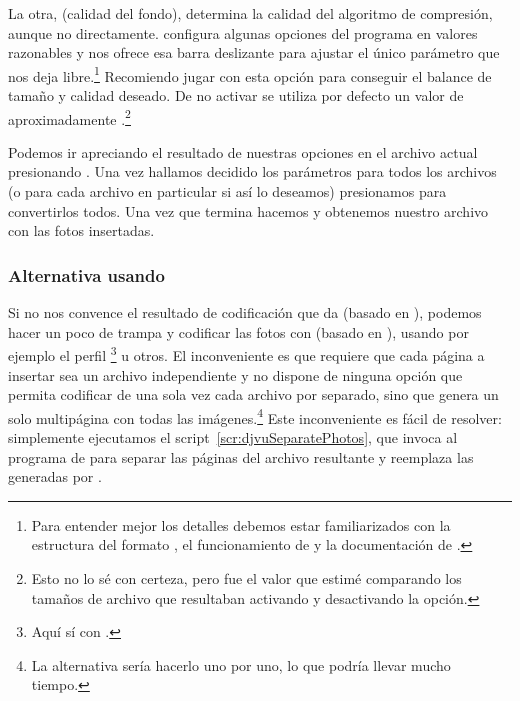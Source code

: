 \documentclass[%
	a5paper,
	10pt,
	twoside,
	openright,
	final,
]{memoir}
\begin{document}
{	La otra,  (calidad del fondo), determina la calidad del algoritmo de compresión, aunque no directamente. \mondaytwothousand configura algunas opciones del programa  en valores razonables y nos ofrece esa barra deslizante para ajustar el único parámetro que nos deja libre.\footnote{Para entender mejor los detalles debemos estar familiarizados con la estructura del formato \djvu, el funcionamiento de  y la documentación de \djvuimager.} Recomiendo jugar con esta opción para conseguir el balance de tamaño y calidad deseado. De no activar  se utiliza por defecto un valor de aproximadamente .\footnote{Esto no lo sé con certeza, pero fue el valor que estimé comparando los tamaños de archivo que resultaban activando y desactivando la opción.}

	Podemos ir apreciando el resultado de nuestras opciones en el archivo actual presionando . Una vez hallamos decidido los parámetros para todos los archivos (o para cada archivo en particular si así lo deseamos) presionamos  para convertirlos todos. Una vez que termina hacemos  y obtenemos nuestro archivo con las fotos insertadas.

	\subsubsection{Alternativa usando \djvusmall} Si no nos convence el resultado de codificación que da \djvuimager (basado en \djvulibre), podemos hacer un poco de trampa y codificar las fotos con \djvusmall (basado en \dexpress), usando por ejemplo el perfil \footnote{Aquí sí con .} u otros. El inconveniente es que \djvuimager requiere que cada página a insertar sea un archivo \djvu independiente y \djvusmall no dispone de ninguna opción que permita codificar de una sola vez cada archivo por separado, sino que genera un solo \djvu multipágina con todas las imágenes.\footnote{La alternativa sería hacerlo uno por uno, lo que podría llevar mucho tiempo.} Este inconveniente es fácil de resolver: simplemente ejecutamos el script~\ref{scr:djvuSeparatePhotos}, que invoca al programa  de \djvulibre para separar las páginas del archivo resultante y reemplaza las generadas por \djvuimager.


}
\end{document}
